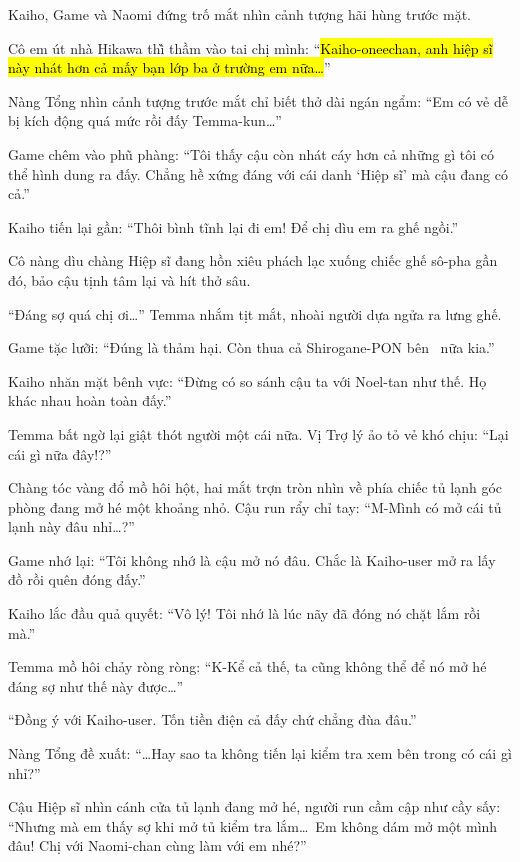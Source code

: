 \documentclass[../main.tex]{subfiles}
\begin{document}
Kaiho, Game và Naomi đứng trố mắt nhìn cảnh tượng hãi hùng trước mặt.

Cô em út nhà Hikawa thì̀ thầm vào tai chị mình: ``\hl{Kaiho-oneechan, anh hiệp sĩ này nhát hơn cả mấy bạn lớp ba ở trường em nữa\dots}''

Nàng Tổng nhìn cảnh tượng trước mắt chỉ biết thở dài ngán ngẩm: ``Em có vẻ dễ bị kích động quá mức rồi đấy Temma-kun\dots''

Game chêm vào phũ phàng: ``Tôi thấy cậu còn nhát cáy hơn cả những gì tôi có thể hình dung ra đấy. Chẳng hề xứng đáng với cái danh `Hiệp sĩ' mà cậu đang có cả.''

Kaiho tiến lại gần: ``Thôi bình tĩnh lại đi em! Để chị dìu em ra ghế ngồi.''

Cô nàng dìu chàng Hiệp sĩ đang hồn xiêu phách lạc xuống chiếc ghế sô-pha gần đó, bảo cậu tịnh tâm lại và hít thở sâu.

``Đáng sợ quá chị ơi\dots'' Temma nhắm tịt mắt, nhoài người dựa ngửa ra lưng ghế.

Game tặc lưỡi: ``Đúng là thảm hại. Còn thua cả Shirogane-PON bên \hll\ nữa kia.''

Kaiho nhăn mặt bênh vực: ``Đừng có so sánh cậu ta với Noel-tan như thế. Họ khác nhau hoàn toàn đấy.''

Temma bất ngờ lại giật thót người một cái nữa. Vị Trợ lý ảo tỏ vẻ khó chịu: ``Lại cái gì nữa đây!?''

Chàng tóc vàng đổ mồ hôi hột, hai mắt trợn tròn nhìn về phía chiếc tủ lạnh góc phòng đang mở hé một khoảng nhỏ. Cậu run rẩy chỉ tay: ``M-Mình có mở cái tủ lạnh này đâu nhỉ\dots?''


Game nhớ lại: ``Tôi không nhớ là cậu mở nó đâu. Chắc là Kaiho-user mở ra lấy đồ rồi quên đóng đấy.''

Kaiho lắc đầu quả quyết: ``Vô lý! Tôi nhớ là lúc nãy đã đóng nó chặt lắm rồi mà.''

Temma mồ hôi chảy ròng ròng: ``K-Kể cả thế, ta cũng không thể để nó mở hé đáng sợ như thế này được\dots''

``Đồng ý với Kaiho-user. Tốn tiền điện cả đấy chứ chẳng đùa đâu.''

Nàng Tổng đề xuất: ``\dots Hay sao ta không tiến lại kiểm tra xem bên trong có cái gì nhỉ?''

Cậu Hiệp sĩ nhìn cánh cửa tủ lạnh đang mở hé, người run cầm cập như cầy sấy: ``Nhưng mà em thấy sợ khi mở tủ kiểm tra lắm\dots\ Em không dám mở một mình đâu! Chị với Naomi-chan cùng làm với em nhé?''
\end{document}
